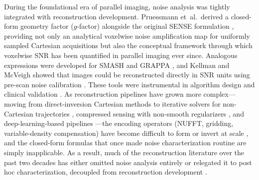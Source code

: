 \documentclass[AMA,STIX2COL,Linenumberson]{MRM}
\begin{document}
During the foundational era of parallel imaging, noise 
analysis was tightly integrated with reconstruction 
development. Pruessmann et~al.\ derived a closed-form 
geometry factor ($g$-factor) alongside the original SENSE 
formulation \cite{sense}, providing not only an analytical 
voxelwise noise amplification map for uniformly sampled 
Cartesian acquisitions but also the conceptual framework 
through which voxelwise SNR has been quantified in 
parallel imaging ever since. Analogous expressions were 
developed for SMASH \cite{smash_noise} and GRAPPA 
\cite{Breuer2009,grappa_noise}, and Kellman and McVeigh 
showed that images could be reconstructed directly in SNR 
units using pre-scan noise calibration \cite{image_recon_SNR}. 
These tools were instrumental in algorithm design and 
clinical validation \cite{sense_clinic,Goerner2011}.  As reconstruction pipelines have grown more complex---moving from 
direct-inversion Cartesian methods to iterative solvers for 
non-Cartesian trajectories 
\cite{Pruessmann2001,generalized_sense,cg_sense_revisited}, 
compressed sensing with non-smooth regularizers 
\cite{cs_mri_review,shreyas_cs}, and deep-learning-based 
pipelines \cite{unrolled_1,Heckel2024}---the encoding 
operators (NUFFT, gridding, variable-density compensation) 
have become difficult to form or invert at scale 
\cite{Pruessmann2001,Pruessmann1999,fessler2005}, and the 
closed-form formulas that once made noise characterization 
routine are simply inapplicable. As a 
result, much of the reconstruction literature over the past 
two decades has either omitted noise analysis entirely or 
relegated it to post hoc characterization, decoupled from reconstruction 
development \cite{simulation,montin2021snr}.
\end{document}
